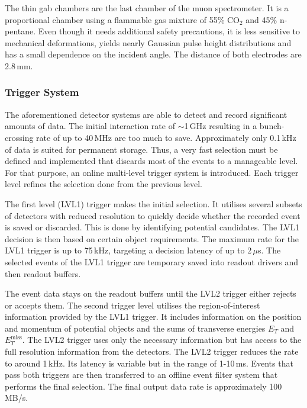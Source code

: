 \documentclass[bachelor,ngerman,english]{GAUBM}
\begin{document}
The thin gab chambers \cite{atlas:tech_design_report_01,atlas:muon_chamber} are the last chamber of the muon spectrometer. It is a proportional chamber using a flammable gas mixture of 55\% CO$_2$ and 45\% n-pentane. Even though it needs additional safety precautions, it is less sensitive to mechanical deformations, yields nearly Gaussian pulse height distributions and has a small dependence on the incident angle. The distance of both electrodes are 2.8\,mm.

\subsubsection*{Trigger System}
The aforementioned detector systems are able to detect and record significant amounts of data. The initial interaction rate of $\sim$1\,GHz resulting in a bunch-crossing rate of up to 40\,MHz \cite{atlas:tech_design_report_01} are too much to save. Approximately only 0.1\,kHz of data is suited for permanent storage. Thus, a very fast selection must be defined and implemented that discards most of the events to a manageable level. For that purpose, an online multi-level trigger system is introduced. Each trigger level refines the selection done from the previous level.

The first level (LVL1) trigger \cite{atlas:tech_design_report_01,atlas:trigger_lvl_1} makes the initial selection. It utilises several subsets of detectors with reduced resolution to quickly decide whether the recorded event is saved or discarded. This is done by identifying potential candidates. The LVL1 decision is then based on certain object requirements. The maximum rate for the LVL1 trigger is up to 75\,kHz, targeting a decision latency of up to 2\,$\mu$s. The selected events of the LVL1 trigger are temporary saved into readout drivers and then readout buffers. 

The event data stays on the readout buffers until the LVL2 trigger \cite{atlas:tech_design_report_01,atlas:trigger_lvl_high} either rejects or accepts them. The second trigger level utilises the region-of-interest information provided by the LVL1 trigger. It includes information on the position and momentum of potential objects and the sums of transverse energies $E_T$ and $E_T^\text{miss}$. The LVL2 trigger uses only the necessary information but has access to the full resolution information from the detectors. The LVL2 trigger reduces the rate to around 1\,kHz. Its latency is variable but in the range of 1-10\,ms. Events that pass both triggers are then transferred to an offline event filter system that performs the final selection. The final output data rate is approximately 100\,MB/s.
\end{document}
